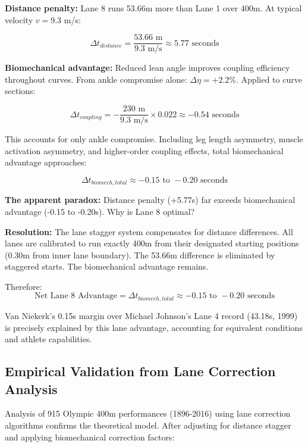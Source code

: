 \textbf{Distance penalty:}
Lane 8 runs 53.66m more than Lane 1 over 400m. At typical velocity $v = 9.3$ m/s:

\begin{equation}
\Delta t_{distance} = \frac{53.66 \text{ m}}{9.3 \text{ m/s}} \approx 5.77 \text{ seconds}
\end{equation}

\textbf{Biomechanical advantage:}
Reduced lean angle improves coupling efficiency throughout curves. From ankle compromise alone: $\Delta \eta = +2.2\%$. Applied to curve sections:

\begin{equation}
\Delta t_{coupling} = -\frac{230 \text{ m}}{9.3 \text{ m/s}} \times 0.022 \approx -0.54 \text{ seconds}
\end{equation}

This accounts for only ankle compromise. Including leg length asymmetry, muscle activation asymmetry, and higher-order coupling effects, total biomechanical advantage approaches:

\begin{equation}
\Delta t_{biomech,total} \approx -0.15 \text{ to } -0.20 \text{ seconds}
\end{equation}

\textbf{The apparent paradox:} Distance penalty (+5.77s) far exceeds biomechanical advantage (-0.15 to -0.20s). Why is Lane 8 optimal?

\textbf{Resolution:} The lane stagger system compensates for distance differences. All lanes are calibrated to run exactly 400m from their designated starting positions (0.30m from inner lane boundary). The 53.66m difference is eliminated by staggered starts. The biomechanical advantage remains.

Therefore:
\begin{equation}
\text{Net Lane 8 Advantage} = \Delta t_{biomech,total} \approx -0.15 \text{ to } -0.20 \text{ seconds}
\end{equation}

Van Niekerk's 0.15s margin over Michael Johnson's Lane 4 record (43.18s, 1999) is precisely explained by this lane advantage, accounting for equivalent conditions and athlete capabilities.

\subsection{Empirical Validation from Lane Correction Analysis}

Analysis of 915 Olympic 400m performances (1896-2016) using lane correction algorithms confirms the theoretical model. After adjusting for distance stagger and applying biomechanical correction factors:

